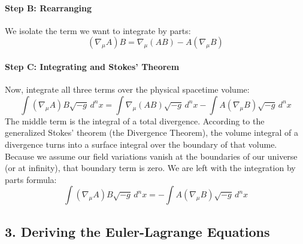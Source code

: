 \documentclass[11pt, a4paper]{report}
\begin{document}
\paragraph{Step B: Rearranging}
We isolate the term we want to integrate by parts:
\begin{equation}
    (\nabla_\mu A) B = \nabla_\mu (A B) - A (\nabla_\mu B)
\end{equation}

\paragraph{Step C: Integrating and Stokes' Theorem}
Now, integrate all three terms over the physical spacetime volume:
\begin{equation}
    \int (\nabla_\mu A) B \sqrt{-g} \, d^n x = \int \nabla_\mu (A B) \sqrt{-g} \, d^n x - \int A (\nabla_\mu B) \sqrt{-g} \, d^n x
\end{equation}
The middle term is the integral of a total divergence. According to the generalized Stokes' theorem (the Divergence Theorem), the volume integral of a divergence turns into a surface integral over the boundary of that volume. Because we assume our field variations vanish at the boundaries of our universe (or at infinity), that boundary term is zero. We are left with the integration by parts formula:
\begin{equation}
    \int (\nabla_\mu A) B \sqrt{-g} \, d^n x = - \int A (\nabla_\mu B) \sqrt{-g} \, d^n x
\end{equation}

\subsection*{3. Deriving the Euler-Lagrange Equations}
\end{document}
